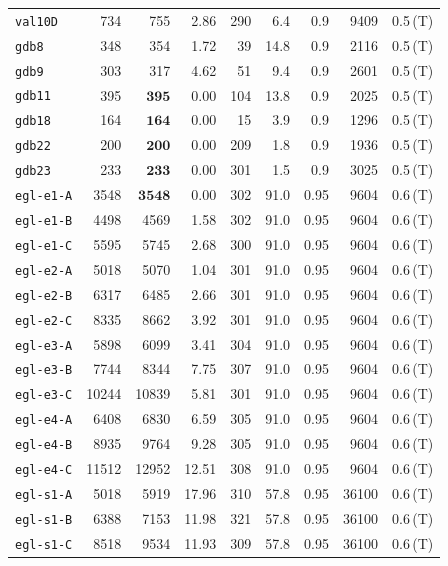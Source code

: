 \begin{longtable}{lrrrrrrrl}
\texttt{val10D} & 734 & 755 & 2.86 & 290 & 6.4 & 0.9 & 9409 & 0.5\,(T) \\
\texttt{gdb8} & 348 & 354 & 1.72 & 39 & 14.8 & 0.9 & 2116 & 0.5\,(T) \\
\texttt{gdb9} & 303 & 317 & 4.62 & 51 & 9.4 & 0.9 & 2601 & 0.5\,(T) \\
\texttt{gdb11} & 395 & $\mathbf{395}$ & 0.00 & 104 & 13.8 & 0.9 & 2025 & 0.5\,(T) \\
\texttt{gdb18} & 164 & $\mathbf{164}$ & 0.00 & 15 & 3.9 & 0.9 & 1296 & 0.5\,(T) \\
\texttt{gdb22} & 200 & $\mathbf{200}$ & 0.00 & 209 & 1.8 & 0.9 & 1936 & 0.5\,(T) \\
\texttt{gdb23} & 233 & $\mathbf{233}$ & 0.00 & 301 & 1.5 & 0.9 & 3025 & 0.5\,(T) \\
\texttt{egl-e1-A} & 3548 & $\mathbf{3548}$ & 0.00 & 302 & 91.0 & 0.95 & 9604 & 0.6\,(T) \\
\texttt{egl-e1-B} & 4498 & 4569 & 1.58 & 302 & 91.0 & 0.95 & 9604 & 0.6\,(T) \\
\texttt{egl-e1-C} & 5595 & 5745 & 2.68 & 300 & 91.0 & 0.95 & 9604 & 0.6\,(T) \\
\texttt{egl-e2-A} & 5018 & 5070 & 1.04 & 301 & 91.0 & 0.95 & 9604 & 0.6\,(T) \\
\texttt{egl-e2-B} & 6317 & 6485 & 2.66 & 301 & 91.0 & 0.95 & 9604 & 0.6\,(T) \\
\texttt{egl-e2-C} & 8335 & 8662 & 3.92 & 301 & 91.0 & 0.95 & 9604 & 0.6\,(T) \\
\texttt{egl-e3-A} & 5898 & 6099 & 3.41 & 304 & 91.0 & 0.95 & 9604 & 0.6\,(T) \\
\texttt{egl-e3-B} & 7744 & 8344 & 7.75 & 307 & 91.0 & 0.95 & 9604 & 0.6\,(T) \\
\texttt{egl-e3-C} & 10244 & 10839 & 5.81 & 301 & 91.0 & 0.95 & 9604 & 0.6\,(T) \\
\texttt{egl-e4-A} & 6408 & 6830 & 6.59 & 305 & 91.0 & 0.95 & 9604 & 0.6\,(T) \\
\texttt{egl-e4-B} & 8935 & 9764 & 9.28 & 305 & 91.0 & 0.95 & 9604 & 0.6\,(T) \\
\texttt{egl-e4-C} & 11512 & 12952 & 12.51 & 308 & 91.0 & 0.95 & 9604 & 0.6\,(T) \\
\texttt{egl-s1-A} & 5018 & 5919 & 17.96 & 310 & 57.8 & 0.95 & 36100 & 0.6\,(T) \\
\texttt{egl-s1-B} & 6388 & 7153 & 11.98 & 321 & 57.8 & 0.95 & 36100 & 0.6\,(T) \\
\texttt{egl-s1-C} & 8518 & 9534 & 11.93 & 309 & 57.8 & 0.95 & 36100 & 0.6\,(T) \\

\end{longtable}
